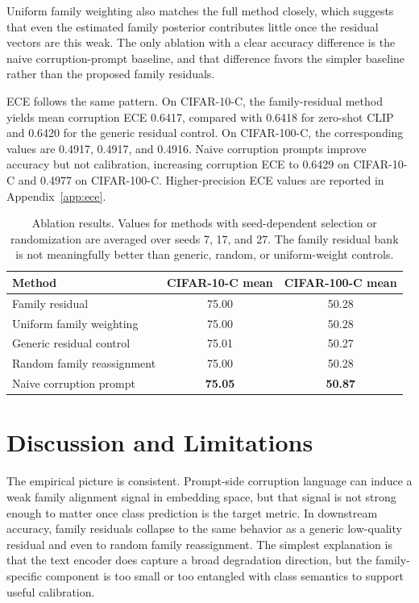 \documentclass{article}
\begin{document}
Uniform family weighting also matches the full method closely, which suggests that even the estimated family posterior contributes little once the residual vectors are this weak. The only ablation with a clear accuracy difference is the naive corruption-prompt baseline, and that difference favors the simpler baseline rather than the proposed family residuals.

ECE follows the same pattern. On CIFAR-10-C, the family-residual method yields mean corruption ECE 0.6417, compared with 0.6418 for zero-shot CLIP and 0.6420 for the generic residual control. On CIFAR-100-C, the corresponding values are 0.4917, 0.4917, and 0.4916. Naive corruption prompts improve accuracy but not calibration, increasing corruption ECE to 0.6429 on CIFAR-10-C and 0.4977 on CIFAR-100-C. Higher-precision ECE values are reported in Appendix~\ref{app:ece}.

\begin{table}[t]
\caption{Ablation results. Values for methods with seed-dependent selection or randomization are averaged over seeds 7, 17, and 27. The family residual bank is not meaningfully better than generic, random, or uniform-weight controls.}
\label{tab:ablation}
\centering
\small
\begin{tabular}{lcc}
\toprule
Method & CIFAR-10-C mean & CIFAR-100-C mean \\
\midrule
Family residual & 75.00 & 50.28 \\
Uniform family weighting & 75.00 & 50.28 \\
Generic residual control & 75.01 & 50.27 \\
Random family reassignment & 75.00 & 50.28 \\
Naive corruption prompt & \textbf{75.05} & \textbf{50.87} \\
\bottomrule
\end{tabular}
\end{table}

\section{Discussion and Limitations}
\label{sec:discussion}

The empirical picture is consistent. Prompt-side corruption language can induce a weak family alignment signal in embedding space, but that signal is not strong enough to matter once class prediction is the target metric. In downstream accuracy, family residuals collapse to the same behavior as a generic low-quality residual and even to random family reassignment. The simplest explanation is that the text encoder does capture a broad degradation direction, but the family-specific component is too small or too entangled with class semantics to support useful calibration.
\end{document}
